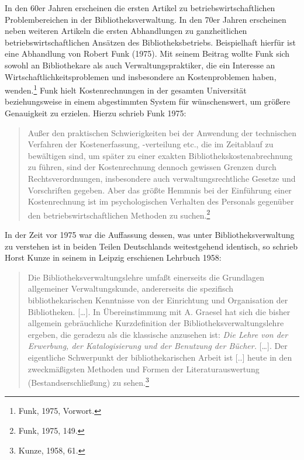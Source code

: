 \documentclass[a4paper,
fontsize=11pt,
oneside,
numbers=noperiodatend,
parskip=half-,
bibliography=totoc,
final
]{scrartcl}
\begin{document}
In den 60er Jahren erscheinen die ersten Artikel zu
betriebswirtschaftlichen Problembereichen in der Bibliotheksverwaltung.
In den 70er Jahren erscheinen neben weiteren Artikeln die ersten
Abhandlungen zu ganzheitlichen betriebswirtschaftlichen Ansätzen des
Bibliotheksbetriebs. Beispielhaft hierfür ist eine Abhandlung von Robert
Funk (1975). Mit seinem Beitrag wollte Funk sich sowohl an Bibliothekare
als auch Verwaltungspraktiker, die ein Interesse an
Wirtschaftlichkeitsproblemen und insbesondere an Kostenproblemen haben,
wenden.\footnote{Funk, 1975, Vorwort.} Funk hielt Kostenrechnungen in
der gesamten Universität beziehungsweise in einem abgestimmten System
für wünschenswert, um größere Genauigkeit zu erzielen. Hierzu schrieb
Funk 1975:

\begin{quote}
Außer den praktischen Schwierigkeiten bei der Anwendung der technischen
Verfahren der Kostenerfassung, -verteilung etc., die im Zeitablauf zu
bewältigen sind, um später zu einer exakten Bibliothekskostenabrechnung
zu führen, sind der Kostenrechnung dennoch gewissen Grenzen durch
Rechtsverordnungen, insbesondere auch verwaltungsrechtliche Gesetze und
Vorschriften gegeben. Aber das größte Hemmnis bei der Einführung einer
Kostenrechnung ist im psychologischen Verhalten des Personals gegenüber
den betriebswirtschaftlichen Methoden zu suchen.\footnote{Funk, 1975,
  149.}
\end{quote}

In der Zeit vor 1975 war die Auffassung dessen, was unter
Bibliotheksverwaltung zu verstehen ist in beiden Teilen Deutschlands
weitestgehend identisch, so schrieb Horst Kunze in seinem in Leipzig
erschienen Lehrbuch 1958:

\begin{quote}
Die Bibliotheksverwaltungslehre umfaßt einerseits die Grundlagen
allgemeiner Verwaltungskunde, andererseits die spezifisch
bibliothekarischen Kenntnisse von der Einrichtung und Organisation der
Bibliotheken. {[}\ldots{}{]}. In Übereinstimmung mit A. Graesel hat sich
die bisher allgemein gebräuchliche Kurzdefinition der
Bibliotheksverwaltungslehre ergeben, die geradezu als die klassische
anzusehen ist: \emph{Die Lehre von der Erwerbung, der Katalogisierung
und der Benutzung der Bücher.} {[}\ldots{}{]}. Der eigentliche
Schwerpunkt der bibliothekarischen Arbeit ist {[}..{]} heute in den
zweckmäßigsten Methoden und Formen der Literaturauswertung
(Bestandserschließung) zu sehen.\footnote{Kunze, 1958, 61.}
\end{quote}
\end{document}
